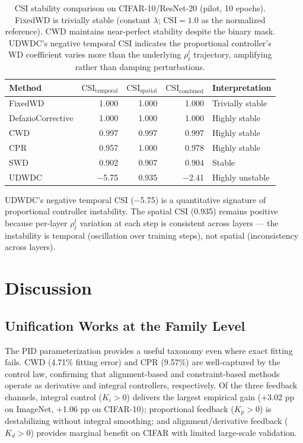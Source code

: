 \documentclass{article}
\begin{document}
\begin{table}[t]
\centering
\caption{CSI stability comparison on CIFAR-10/ResNet-20 (pilot, 10 epochs). FixedWD is trivially stable (constant $\lambda$; $\text{CSI}=1.0$ as the normalized reference). CWD maintains near-perfect stability despite the binary mask. UDWDC's negative temporal CSI indicates the proportional controller's WD coefficient varies more than the underlying $\rho_t^l$ trajectory, amplifying rather than damping perturbations.}
\label{tab:csi}
\begin{tabular}{lrrrp{4cm}}
\toprule
Method & $\text{CSI}_\text{temporal}$ & $\text{CSI}_\text{spatial}$ & $\text{CSI}_\text{combined}$ & Interpretation \\
\midrule
FixedWD & 1.000 & 1.000 & 1.000 & Trivially stable \\
DefazioCorrective & 1.000 & 1.000 & 1.000 & Highly stable \\
CWD & 0.997 & 0.997 & 0.997 & Highly stable \\
CPR & 0.957 & 1.000 & 0.978 & Highly stable \\
SWD & 0.902 & 0.907 & 0.904 & Stable \\
UDWDC & $-$5.75 & 0.935 & $-$2.41 & Highly unstable \\
\bottomrule
\end{tabular}
\end{table}

UDWDC's negative temporal CSI ($-$5.75) is a quantitative signature of proportional controller instability. The spatial CSI (0.935) remains positive because per-layer $\rho_t^l$ variation at each step is consistent across layers --- the instability is temporal (oscillation over training steps), not spatial (inconsistency across layers).

\section{Discussion}
\label{sec:discussion}

\subsection{Unification Works at the Family Level}

The PID parameterization provides a useful taxonomy even where exact fitting fails. CWD (4.71\% fitting error) and CPR (9.57\%) are well-captured by the control law, confirming that alignment-based and constraint-based methods operate as derivative and integral controllers, respectively. Of the three feedback channels, integral control ($K_i > 0$) delivers the largest empirical gain (+3.02 pp on ImageNet, +1.06 pp on CIFAR-10); proportional feedback ($K_p > 0$) is destabilizing without integral smoothing; and alignment/derivative feedback ($K_d > 0$) provides marginal benefit on CIFAR with limited large-scale validation.
\end{document}
